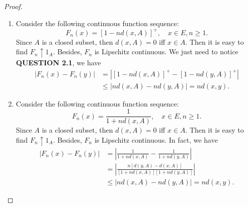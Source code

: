 \documentclass[12pt]{article}
\renewcommand{\(}{\left(}%
\renewcommand{\)}{\right)}%
\renewcommand{\[}{\left[}%
\renewcommand{\]}{\right]}%
\newtheorem{proof}{Proof.}}
\begin{document}
\begin{proof}
\begin{enumerate}
    \begin{enumerate}
     \item Consider the following continuous function sequence:
    \begin{equation*}
     F_n(x)=[1-nd(x,A)]^+,\quad x\in E,n\geq 1.
    \end{equation*}
    Since $A$ is a closed subset, then $d(x,A)=0$ iff $x\in A$. Then it is easy to find $F_n\uparrow 1_A$. Besides, $F_n$ is Lipschitz continuous. We just need to notice {\bfseries QUESTION 2.1}, we have
    \begin{equation*}
     \begin{split}
      |F_n(x)-F_n(y)|&=|[1-nd(x,A)]^+-[1-nd(y,A)]^+|\\
      &\leq |nd(x,A)-nd(y,A) |=nd(x,y).
     \end{split}
    \end{equation*}
     \item Consider the following continuous function sequence:
    \begin{equation*}
     F_n(x)=\frac{1}{1+nd(x,A)} ,\quad x\in E,n\geq 1.
    \end{equation*}
    Since $A$ is a closed subset, then $d(x,A)=0$ iff $x\in A$. Then it is easy to find $F_n\uparrow 1_A$. Besides, $F_n$ is Lipschitz continuous. In fact, we have
    \begin{equation*}
     \begin{split}
      |F_n(x)-F_n(y)|&=\left|\frac{1}{1+nd(x,A)}-\frac{1}{1+nd(y,A)}\right|\\
      &=\left|\frac{n[d(y,A)-d(x,A)]}{[1+nd(x,A)][1+nd(y,A)]} \right|\\
      & \leq |nd(x,A)-nd(y,A) |=nd(x,y).
     \end{split}
    \end{equation*}
    \end{enumerate}
   \end{enumerate}
  \end{proof}
\end{document}
